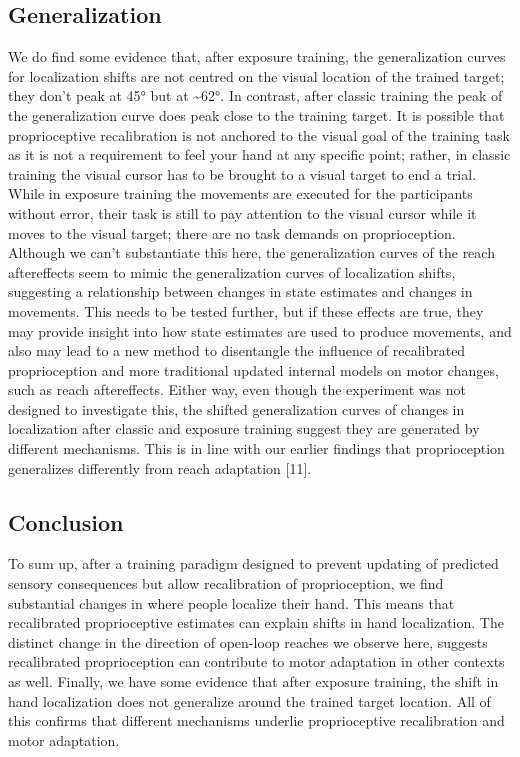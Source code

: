 \documentclass[10pt,letterpaper]{article}
\begin{document}
\subsection{Generalization}\label{generalization}

We do find some evidence that, after exposure training, the
generalization curves for localization shifts are not centred on the
visual location of the trained target; they don't peak at 45° but at
\textasciitilde{}62°. In contrast, after classic training the peak of
the generalization curve does peak close to the training target. It is
possible that proprioceptive recalibration is not anchored to the visual
goal of the training task as it is not a requirement to feel your hand
at any specific point; rather, in classic training the visual cursor has
to be brought to a visual target to end a trial. While in exposure
training the movements are executed for the participants without error,
their task is still to pay attention to the visual cursor while it moves
to the visual target; there are no task demands on proprioception.
Although we can't substantiate this here, the generalization curves of
the reach aftereffects seem to mimic the generalization curves of
localization shifts, suggesting a relationship between changes in state
estimates and changes in movements. This needs to be tested further, but
if these effects are true, they may provide insight into how state
estimates are used to produce movements, and also may lead to a new
method to disentangle the influence of recalibrated proprioception and
more traditional updated internal models on motor changes, such as reach
aftereffects. Either way, even though the experiment was not designed to
investigate this, the shifted generalization curves of changes in
localization after classic and exposure training suggest they are
generated by different mechanisms. This is in line with our earlier
findings that proprioception generalizes differently from reach
adaptation {[}11{]}.

\subsection{Conclusion}\label{conclusion}

To sum up, after a training paradigm designed to prevent updating of
predicted sensory consequences but allow recalibration of
proprioception, we find substantial changes in where people localize
their hand. This means that recalibrated proprioceptive estimates can
explain shifts in hand localization. The distinct change in the
direction of open-loop reaches we observe here, suggests recalibrated
proprioception can contribute to motor adaptation in other contexts as
well. Finally, we have some evidence that after exposure training, the
shift in hand localization does not generalize around the trained target
location. All of this confirms that different mechanisms underlie
proprioceptive recalibration and motor adaptation.
\end{document}
